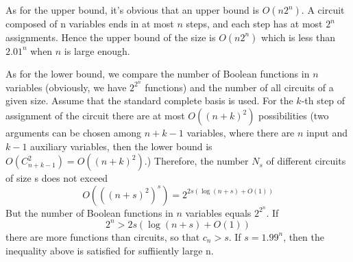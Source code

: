 \documentclass[11pt]{article}
\begin{document}
As for the upper bound, it's obvious that an upper bound is $O(n2^n)$. A circuit composed of n variables ends in at most $n$ steps, and each step has at most $2^n$ assignments. Hence the upper bound of the size is $O(n2^n)$ which is less than $2.01^n$ when $n$ is large enough.

As for the lower bound, we compare the number of Boolean functions in $n$ variables (obviously, we have $2^{2^n}$ functions) and the number of all circuits of a given size. Assume that the standard complete basis is used. For the $k$-th step of assignment of the circuit there are at most $O((n+k)^2)$ possibilities (two arguments can be chosen among $n+k-1$ variables, where there are $n$ input and $ k-1$ auxiliary variables, then the lower bound is $O(C_{n+k-1}^2)=O((n+k)^2)$.) Therefore, the number $N_s$ of different circuits of size s does not exceed
$$
O(((n+s)^2)^s)=2^{2s(\log(n+s)+O(1))}
$$
But the number of Boolean functions in $n$ variables equals $2^{2^n}$. If
$$
2^n>2s(\log(n+s)+O(1))
$$
there are more functions than circuits, so that $c_n>s$. If $s=1.99^n$, then the inequality above is satisfied for suffiiently large n.
\end{document}
